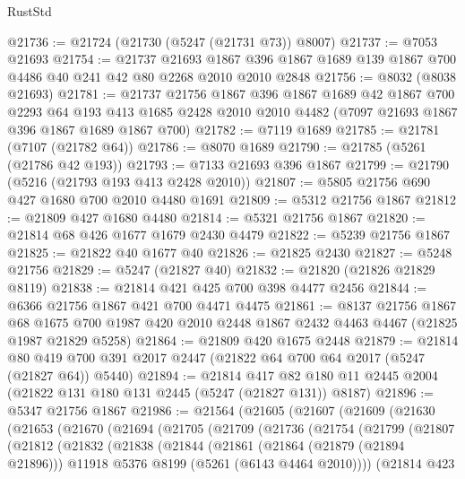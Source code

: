 \begin{lexlean}{RustStd}
\begin{coremodule}
@21736 := @21724 (@21730 (@5247 (@21731 @73)) @8007)
@21737 := @7053 @21693
@21754 := @21737
    @21693
    @1867
    @396
    @1867
    @1689
    @139
    @1867
    @700
    @4486
    @40
    @241
    @42
    @80
    @2268
    @2010
    @2010
    @2848
@21756 := @8032 (@8038 @21693)
@21781 := @21737
    @21756
    @1867
    @396
    @1867
    @1689
    @42
    @1867
    @700
    @2293
    @64
    @193
    @413
    @1685
    @2428
    @2010
    @2010
    @4482
    (@7097 @21693 @1867 @396 @1867 @1689 @1867 @700)
@21782 := @7119 @1689
@21785 := @21781 (@7107 (@21782 @64))
@21786 := @8070 @1689
@21790 := @21785 (@5261 (@21786 @42 @193))
@21793 := @7133 @21693 @396 @1867
@21799 := @21790 (@5216 (@21793 @193 @413 @2428 @2010))
@21807 := @5805 @21756 @690 @427 @1680 @700 @2010 @4480 @1691
@21809 := @5312 @21756 @1867
@21812 := @21809 @427 @1680 @4480
@21814 := @5321 @21756 @1867
@21820 := @21814 @68 @426 @1677 @1679 @2430 @4479
@21822 := @5239 @21756 @1867
@21825 := @21822 @40 @1677 @40
@21826 := @21825 @2430
@21827 := @5248 @21756
@21829 := @5247 (@21827 @40)
@21832 := @21820 (@21826 @21829 @8119)
@21838 := @21814 @421 @425 @700 @398 @4477 @2456
@21844 := @6366 @21756 @1867 @421 @700 @4471 @4475
@21861 := @8137
    @21756
    @1867
    @68
    @1675
    @700
    @1987
    @420
    @2010
    @2448
    @1867
    @2432
    @4463
    @4467
    (@21825 @1987 @21829 @5258)
@21864 := @21809 @420 @1675 @2448
@21879 := @21814
    @80
    @419
    @700
    @391
    @2017
    @2447
    (@21822 @64 @700 @64 @2017 (@5247 (@21827 @64)) @5440)
@21894 := @21814
    @417
    @82
    @180
    @11
    @2445
    @2004
    (@21822 @131 @180 @131 @2445 (@5247 (@21827 @131)) @8187)
@21896 := @5347 @21756 @1867
@21986 := @21564
    (@21605
      (@21607
        (@21609
          (@21630
            (@21653
              (@21670
                (@21694
                  (@21705
                    (@21709
                      (@21736
                        (@21754
                          (@21799
                            (@21807
                              (@21812
                                (@21832
                                  (@21838
                                    (@21844
                                      (@21861
                                        (@21864 (@21879 (@21894 @21896)))
                                        @11918
                                        @5376
                                        @8199
                                        (@5261 (@6143 @4464 @2010))))
                                    (@21814
                                      @423

\end{coremodule}
\end{lexlean}
